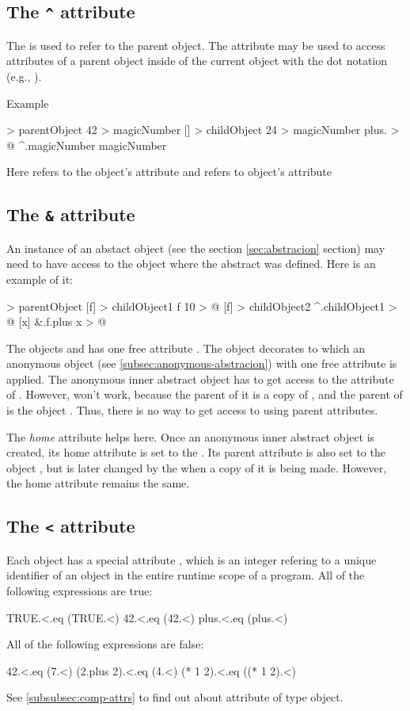 \documentclass[12pt]{book}
\begin{document}
\subsection{The \texttt{\^} attribute}
The  \ff{^} is used to refer to the parent object.
The \ff{^} attribute may be used to access attributes of a parent object inside of the current object with the dot notation (e.g., ).

Example
\begin{ffcode}
[] > parentObject
  42 > magicNumber
  [] > childObject
    24 > magicNumber
    plus. > @
      ^.magicNumber
      magicNumber
\end{ffcode}
Here  refers to the  object's attribute and  refers to  object's attribute

\subsection{The \texttt{\&} attribute}
An instance of an abstact object (see the section \ref{sec:abstracion} section) may need to have access to the
object where the abstract was defined. Here is an example of it:
\begin{ffcode}
[] > parentObject
  [f] > childObject1
    f 10 > @
  [f] > childObject2
    ^.childObject1 > @
      [x]
        &.f.plus x > @
\end{ffcode}
The objects  and  has one free attribute . The object  decorates  to which an anonymous object (see \ref{subsec:anonymous-abstracion}) with one free attribute  is applied. The anonymous inner abstract object has to get access to the attribute  of . However,  won't work, because the parent of it is a copy of , and the parent of  is the object . Thus, there is no way to get access to  using parent attributes.

The \textit{home} attribute \ff{&} helps here. Once an anonymous inner abstract object is created, its home attribute is set to the . Its parent attribute \ff{^} is also set to the object , but is later changed by the  when a copy of it is being made. However, the home attribute remains the same.

\subsection{The \texttt{<} attribute}
Each object has a special attribute \ff{<}, which is an integer refering to a unique identifier of an object in the entire runtime scope of a program. All of the following expressions are true:
\begin{ffcode}
TRUE.<.eq (TRUE.<)
42.<.eq (42.<)
plus.<.eq (plus.<)
\end{ffcode}
All of the following expressions are false:
\begin{ffcode}
42.<.eq (7.<)
(2.plus 2).<.eq (4.<)
(* 1 2).<.eq ((* 1 2).<)
\end{ffcode}
See \ref{subsubsec:comp-attrs} to find out about  attribute of  type object.
\end{document}
